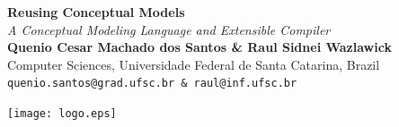 \documentclass[a0,portrait]{a0poster}
\begin{document}


\begin{minipage}[b]{0.75\linewidth}
\veryHuge \color{NavyBlue} \textbf{Reusing Conceptual Models} \color{Black}\\[0.5cm] %
\Huge\textit{A Conceptual Modeling Language and Extensible Compiler}\\[2.0cm] %
\huge \textbf{Quenio Cesar Machado dos Santos \& Raul Sidnei Wazlawick}\\[0.5cm] %
\huge Computer Sciences, Universidade Federal de Santa Catarina, Brazil\\[0.4cm] %
\Large \texttt{quenio.santos@grad.ufsc.br \& raul@inf.ufsc.br} \\
\end{minipage}
%
\begin{minipage}[b]{0.25\linewidth}
\texttt{[image: logo.eps]}\\
\end{minipage}

\vspace{1cm} %

\end{document}
